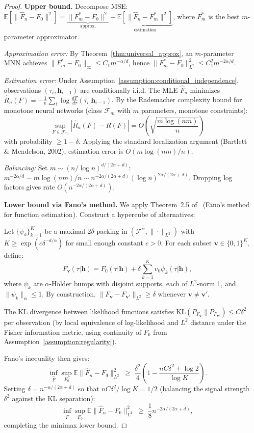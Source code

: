 \begin{proof}
\textbf{Upper bound.}
Decompose MSE:
$\mathbb{E}[\|\hat{F}_n - F_0\|^2]
= \underbrace{\|F_m^* - F_0\|^2}_{\text{approx.}}
+ \underbrace{\mathbb{E}[\|\hat{F}_n - F_m^*\|^2]}_{\text{estimation}}$,
where $F_m^*$ is the best $m$-parameter approximator.

\emph{Approximation error:}
By Theorem~\ref{thm:universal_approx}, an $m$-parameter MNN achieves
$\|F_m^* - F_0\|_\infty \leq C_1 m^{-\alpha/d}$, hence
$\|F_m^* - F_0\|_{L^2}^2 \leq C_1^2 m^{-2\alpha/d}$.

\emph{Estimation error:}
Under Assumption~\ref{assumption:conditional_independence}, observations
$(\tau_i, \boldsymbol{h}_{i-1})$ are conditionally i.i.d.
The MLE $\hat{F}_n$ minimizes $\hat{R}_n(F) = -\frac{1}{n}\sum_i \log\frac{dF}{d\tau}(\tau_i|\boldsymbol{h}_{i-1})$.
By the Rademacher complexity bound for monotone neural networks
(class $\mathcal{F}_m$ with $m$ parameters, monotone constraints):
\[
\sup_{F \in \mathcal{F}_m} |\hat{R}_n(F) - R(F)|
= O\!\left(\sqrt{\frac{m\log(nm)}{n}}\right)
\]
with probability $\geq 1-\delta$.
Applying the standard localization argument (Bartlett \& Mendelson, 2002),
estimation error is $O(m\log(nm)/n)$.

\emph{Balancing:} Set $m \sim (n/\log n)^{d/(2\alpha+d)}$:
$m^{-2\alpha/d} \sim m\log(nm)/n \sim n^{-2\alpha/(2\alpha+d)}(\log n)^{2\alpha/(2\alpha+d)}$.
Dropping log factors gives rate $O(n^{-2\alpha/(2\alpha+d)})$.

\textbf{Lower bound via Fano's method.}
We apply Theorem~2.5 of~\cite{tsybakov2009introduction} (Fano's method
for function estimation). Construct a hypercube of alternatives:

Let $\{\psi_k\}_{k=1}^{K}$ be a maximal $2\delta$-packing in
$(\mathcal{F}^\alpha, \|\cdot\|_{L^2})$ with $K \geq \exp(c \delta^{-d/\alpha})$
for small enough constant $c > 0$.
For each subset $\boldsymbol{v} \in \{0,1\}^K$, define:
\[
F_{\boldsymbol{v}}(\tau|\boldsymbol{h}) = F_0(\tau|\boldsymbol{h})
+ \delta \sum_{k=1}^K v_k \psi_k(\tau|\boldsymbol{h}),
\]
where $\psi_k$ are $\alpha$-Hölder bumps with disjoint supports,
each of $L^2$-norm 1, and $\|\psi_k\|_\alpha \leq 1$.
By construction, $\|F_{\boldsymbol{v}} - F_{\boldsymbol{v}'}\|_{L^2} \geq \delta$
whenever $\boldsymbol{v} \neq \boldsymbol{v}'$.

The KL divergence between likelihood functions satisfies
$\text{KL}(P_{F_{\boldsymbol{v}}} \| P_{F_{\boldsymbol{v}'}}) \leq C \delta^2$
per observation (by local equivalence of log-likelihood and $L^2$ distance
under the Fisher information metric, using continuity of $F_0$ from Assumption~\ref{assumption:regularity}).

Fano's inequality then gives:
\[
\inf_{\hat{F}} \sup_{F_0} \mathbb{E}\|\hat{F}_n - F_0\|_{L^2}^2
\;\geq\; \frac{\delta^2}{4}\left(1 - \frac{n C\delta^2 + \log 2}{\log K}\right).
\]
Setting $\delta = n^{-\alpha/(2\alpha+d)}$ so that $nC\delta^2 / \log K = 1/2$
(balancing the signal strength $\delta^2$ against the KL separation):
\[
\inf_{\hat{F}} \sup_{F_0} \mathbb{E}\|\hat{F}_n - F_0\|_{L^2}^2
\;\geq\; \frac{1}{8} n^{-2\alpha/(2\alpha+d)},
\]
completing the minimax lower bound.
\end{proof}

